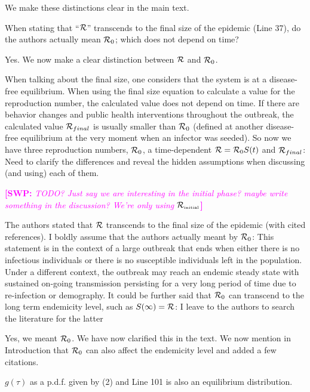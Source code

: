 \documentclass[12pt]{article}
\newcommand{\RR}{\ensuremath{{\cal R}}}
\newcommand{\Rx}[1]{\ensuremath{{\cal R}_{#1}}}
\newcommand{\Ro}{\Rx{0}}
\newcommand{\Rini}{\Rx{\textrm{\tiny initial}}}
\newcommand{\revtext}{\textsf}
\newcommand{\comment}[3]{\textcolor{#1}{\textbf{[#2: }\textsl{#3}\textbf{]}}}
\newcommand{\swp}[1]{\comment{magenta}{SWP}{#1}}
\begin{document}
We make these distinctions clear in the main text.

\revtext{
When stating that ``$\RR$'' transcends to the final size of the epidemic (Line
37), do the authors actually mean $\Ro$; which does not depend on time?
}

Yes. We now make a clear distinction between $\RR$ and $\Ro$.

\revtext{
When talking about the final size, one considers that the system is at a
disease-free equilibrium. When using the final size equation to calculate a
value for the reproduction number, the calculated value does not depend
on time. If there are behavior changes and public health interventions
throughout the outbreak, the calculated value $\RR_{final}$ is usually smaller
than $\Ro$ (defined at another disease-free equilibrium at the very moment
when an infector was seeded). So now we have three reproduction numbers, $\Ro$, a time-dependent $\RR = \Ro S(t)$ and $\RR_{final}$: Need to clarify the differences and reveal the hidden assumptions when discussing (and using)
each of them.
}

\swp{TODO? Just say we are interesting in the initial phase? maybe write something in the discussion? We're only using $\Rini$}

\revtext{
The authors stated that $\RR$ transcends to the final size of the epidemic
(with cited references). I boldly assume that the authors actually meant
by $\Ro$: This statement is in the context of a large outbreak that ends
when either there is no infectious individuals or there is no susceptible
individuals left in the population. Under a different context, the outbreak
may reach an endemic steady state with sustained on-going transmission
persisting for a very long period of time due to re-infection or demography.
It could be further said that $\Ro$ can transcend to the long term endemicity
level, such as $S(\infty) = \RR$: I leave to the authors to search the literature
for the latter
}

Yes, we meant $\Ro$. We have now clarified this in the text.
We now mention in Introduction that $\Ro$ can also affect the endemicity level and added a few citations.

\revtext{$g(\tau)$ as a p.d.f. given by (2) and Line 101 is also an equilibrium
distribution.}
\end{document}
